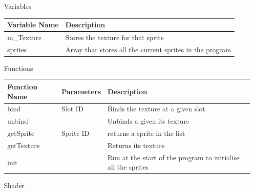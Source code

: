 \documentclass{article}
\begin{document}
                \begin{center}
                    Variables
                    \begin{tabular}{ | m{} | m{} | }
                        \hline
                        \textbf{Variable Name} & \textbf{Description} \\
                        \hline
                        m\_Texture & Stores the texture for that sprite \\
                        \hline
                        sprites & Array that stores all the current sprites in the program \\
                        \hline
                    \end{tabular}
                    Functions
                    \begin{tabular}{ | m{} | m{}| m{} | }
                        \hline
                        \textbf{Function Name} & \textbf{Parameters} & \textbf{Description} \\
                        \hline
                        bind & Slot ID & Binds the texture at a given slot \\
                        \hline
                        unbind & & Unbinds a given its texture \\
                        \hline
                        getSprite & Sprite ID & returns a sprite in the list \\
                        \hline
                        getTexture & & Returns its texture \\
                        \hline
                        init & & Run at the start of the program to initialise all the sprites \\
                        \hline
                    \end{tabular}
                \end{center}
                Shader
\end{document}
